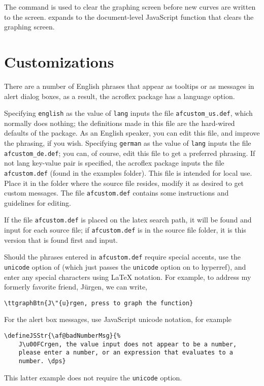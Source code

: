 \documentclass{article}
\def\dps{$\hbox{$\mathfrak D$\kern-.3em\hbox{$\mathfrak P$}%
   \kern-.6em \hbox{$\mathcal S$}}$}
\begin{document}
The command  is used to clear the graphing screen before new curves are written
to the screen.   expands to the document-level JavaScript function that clears
the graphing screen.

\section{Customizations}

There are a number of English phrases that appear as tooltips or as
messages in alert dialog boxes, as a result, the acroflex package has
a language option.
\begin{dCmd}{.75\linewidth}
\usepackage[lang=english|german]{acroflex}
\end{dCmd}
Specifying \texttt{english} as the value of \texttt{lang} inputs the
file \texttt{afcustom\_us.def}, which normally does nothing; the
definitions made in this file are the hard-wired defaults of the
package. As an English speaker, you can edit this file, and improve
the phrasing, if you wish.  Specifying \texttt{german} as the value
of \texttt{lang} inputs the file \texttt{afcustom\_de.def}; you can,
of course, edit this file to get a preferred phrasing. If not lang
key-value pair is specified, the \textsf{acroflex} package inputs
the file \texttt{afcustom.def} (found in the examples folder). This
file is intended for local use. Place it in the folder where the
source file resides, modify it as desired to get custom messages.
The file \texttt{afcustom.def} contains some instructions and guidelines for editing.

\redpoint If the file \texttt{afcustom.def} is placed on the latex search
path, it will be found and input for each source file; if
\texttt{afcustom.def} is in the source file folder, it is this
version that is found first and input.

Should the phrases entered in \texttt{afcustom.def} require special
accents, use the \texttt{unicode} option of {\Web} (which just
passes the \texttt{unicode} option on to hyperref), and enter any
special characters using {\LaTeX} notation. For example, to address
my formerly favorite friend, J\"{u}rgen, we can write,
\begin{verbatim}
\ttgraphBtn{J\"{u}rgen, press to graph the function}
\end{verbatim}
For the alert box messages, use JavaScript unicode notation, for example
\begin{verbatim}
\defineJSStr{\af@badNumberMsg}{%
    J\u00FCrgen, the value input does not appear to be a number,
    please enter a number, or an expression that evaluates to a
    number. \dps}
\end{verbatim}
This latter example does not require the \texttt{unicode} option.
\end{document}
